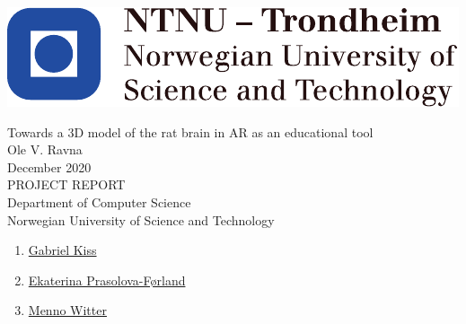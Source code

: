 
\thispagestyle{empty}
\includegraphics[scale=1.1]{fig/NTNU}
\mbox{}\\[6pc]
\begin{center}
\Huge{Towards a 3D model of the rat brain in AR as an educational tool}\\[2pc]

\Large{Ole V. Ravna}\\[1pc]
\large{December 2020}\\[2pc]

PROJECT REPORT\\
Department of Computer Science\\
Norwegian University of Science and Technology
\end{center}
\vfill


\begin{enumerate}[label={Supervisor \arabic*:}]
    \item \href{https://www.ntnu.no/ansatte/gabriel.kiss}{Gabriel Kiss}
    \item \href{https://www.ntnu.no/ansatte/ekaterip}{Ekaterina Prasolova-Førland}
    \item \href{https://www.ntnu.no/ansatte/menno.witter}{Menno Witter}
\end{enumerate}


